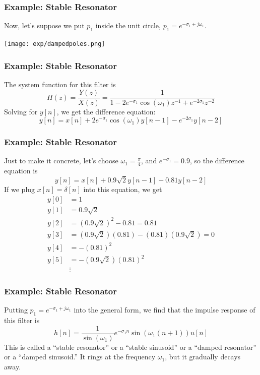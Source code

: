 \documentclass{beamer}
\begin{document}
\begin{frame}
  \frametitle{Example: Stable Resonator}

  Now, let's suppose we put $p_1$ inside the unit
  circle, $p_1=e^{-\sigma_1+j\omega_1}$.

  \centerline{\texttt{[image: exp/dampedpoles.png]}}
\end{frame}

\begin{frame}
  \frametitle{Example: Stable Resonator}

  The system function for this filter is
  \[
  H(z) = \frac{Y(z)}{X(z)} = \frac{1}{1-2e^{-\sigma_1}\cos(\omega_1) z^{-1} + e^{-2\sigma_1}z^{-2}}
  \]
  Solving for $y[n]$, we get the difference equation:
  \[
  y[n] = x[n] + 2e^{-\sigma_1}\cos(\omega_1) y[n-1] - e^{-2\sigma_1}y[n-2]
  \]
\end{frame}

\begin{frame}
  \frametitle{Example: Stable Resonator}

  Just to make it concrete, let's choose $\omega_1=\frac{\pi}{4}$, and
  $e^{-\sigma_1}=0.9$, so the difference equation is
  \[
  y[n] = x[n] + 0.9\sqrt{2} y[n-1] - 0.81 y[n-2]
  \]
  If we plug $x[n]=\delta[n]$ into this equation, we get
  \begin{align*}
    y[0] &= 1\\
    y[1] &= 0.9\sqrt{2}\\
    y[2] &= (0.9\sqrt{2})^2 - 0.81 = 0.81\\
    y[3] &= (0.9\sqrt{2})(0.81)-(0.81)(0.9\sqrt{2})=0\\
    y[4] &= -(0.81)^2\\
    y[5] &= -(0.9\sqrt{2})(0.81)^2\\
    &\vdots
  \end{align*}
\end{frame}

\begin{frame}
  \frametitle{Example: Stable Resonator}

  Putting $p_1=e^{-\sigma_1+j\omega_1}$ into the general form, we find that the
  impulse response of this filter is
  \[
  h[n] = \frac{1}{\sin(\omega_1)}e^{-\sigma_1 n}\sin(\omega_1 (n+1))u[n]
  \]
  This is called a ``stable resonator'' or a ``stable sinusoid'' or a
  ``damped resonator'' or a ``damped sinusoid.''  It rings at the
  frequency $\omega_1$, but it gradually decays away.
\end{frame}

\begin{frame}
  \centerline{}
\end{frame}
\end{document}
